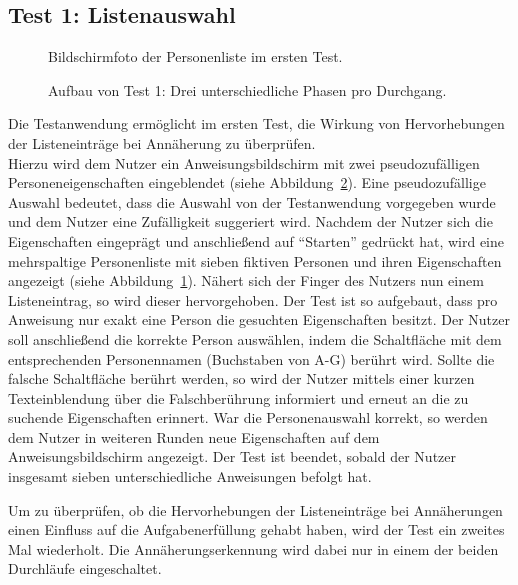 \documentclass[12pt,numbers=noenddot,parskip,bibliography=totocnumbered,listof=totocnumbered]{scrreprt}
\begin{document}
\subsection{Test 1: Listenauswahl}
\begin{figure}
\centering
\caption{Bildschirmfoto der Personenliste im ersten Test.}
\label{test1screenshot}
\end{figure}
\begin{figure}
\centering
{}%
\vfill
{}%
\vfill
{}%
\caption{Aufbau von Test 1: Drei unterschiedliche Phasen pro Durchgang.}
\label{test1phasen}
\end{figure}
Die Testanwendung ermöglicht im ersten Test, die Wirkung von Hervorhebungen der Listeneinträge bei Annäherung zu überprüfen.\\
Hierzu wird dem Nutzer ein Anweisungsbildschirm mit zwei pseudozufälligen Personeneigenschaften eingeblendet (siehe Abbildung~\ref{test1phasen}). Eine pseudozufällige Auswahl bedeutet, dass die Auswahl von der Testanwendung vorgegeben wurde und dem Nutzer eine Zufälligkeit suggeriert wird. Nachdem der Nutzer sich die Eigenschaften eingeprägt und anschließend auf "`Starten"' gedrückt hat, wird eine mehrspaltige Personenliste mit sieben fiktiven Personen und ihren Eigenschaften angezeigt (siehe Abbildung~\ref{test1screenshot}). Nähert sich der Finger des Nutzers nun einem Listeneintrag, so wird dieser hervorgehoben. Der Test ist so aufgebaut, dass pro Anweisung nur exakt eine Person die gesuchten Eigenschaften besitzt. Der Nutzer soll anschließend die korrekte Person auswählen, indem die Schaltfläche mit dem entsprechenden Personennamen (Buchstaben von A-G) berührt wird. Sollte die falsche Schaltfläche berührt werden, so wird der Nutzer mittels einer kurzen Texteinblendung über die Falschberührung informiert und erneut an die zu suchende Eigenschaften erinnert. War die Personenauswahl korrekt, so werden dem Nutzer in weiteren Runden neue Eigenschaften auf dem Anweisungsbildschirm angezeigt. Der Test ist beendet, sobald der Nutzer insgesamt sieben unterschiedliche Anweisungen befolgt hat.

Um zu überprüfen, ob die Hervorhebungen der Listeneinträge bei Annäherungen einen Einfluss auf die Aufgabenerfüllung gehabt haben, wird der Test ein zweites Mal wiederholt. Die Annäherungserkennung wird dabei nur in einem der beiden Durchläufe eingeschaltet.
\end{document}
